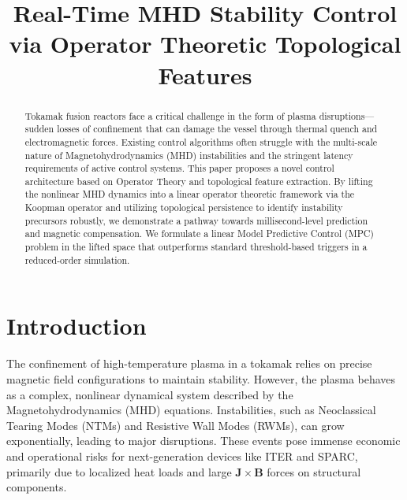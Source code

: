 \documentclass{article}
\title{Real-Time MHD Stability Control via Operator Theoretic Topological Features}
\author{}
\date{}
\begin{document}
\maketitle

\begin{abstract}
Tokamak fusion reactors face a critical challenge in the form of plasma disruptions—sudden losses of confinement that can damage the vessel through thermal quench and electromagnetic forces. Existing control algorithms often struggle with the multi-scale nature of Magnetohydrodynamics (MHD) instabilities and the stringent latency requirements of active control systems. This paper proposes a novel control architecture based on Operator Theory and topological feature extraction. By lifting the nonlinear MHD dynamics into a linear operator theoretic framework via the Koopman operator and utilizing topological persistence to identify instability precursors robustly, we demonstrate a pathway towards millisecond-level prediction and magnetic compensation. We formulate a linear Model Predictive Control (MPC) problem in the lifted space that outperforms standard threshold-based triggers in a reduced-order simulation.
\end{abstract}

\section{Introduction}
The confinement of high-temperature plasma in a tokamak relies on precise magnetic field configurations to maintain stability. However, the plasma behaves as a complex, nonlinear dynamical system described by the Magnetohydrodynamics (MHD) equations. Instabilities, such as Neoclassical Tearing Modes (NTMs) and Resistive Wall Modes (RWMs), can grow exponentially, leading to major disruptions. These events pose immense economic and operational risks for next-generation devices like ITER and SPARC, primarily due to localized heat loads and large $\mathbf{J} \times \mathbf{B}$ forces on structural components.
\end{document}
